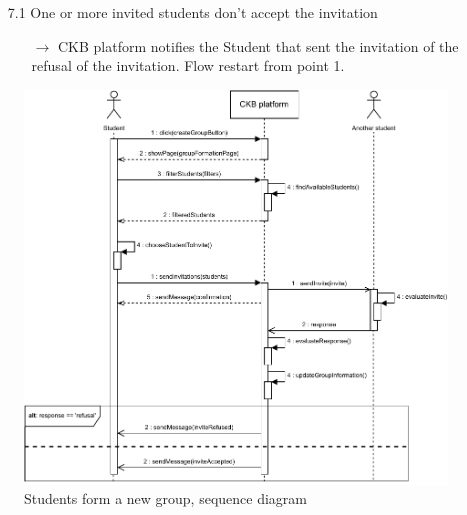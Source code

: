 \documentclass{article}
\begin{document}
{\begin{enumerate}
\begin{xltabular}{\textwidth}
\begin{itemize}
\begin{itemize}
                                                    \end{itemize} 
                                                    \item[7.1] One or more invited students don't accept the invitation
                                                    \begin{itemize}
                                                        \item[$\rightarrow$] CKB platform notifies the Student that sent the invitation
                                                        of the refusal of the invitation. Flow restart from point 1.
                                                    \end{itemize} 
                                                \end{itemize}
                    \end{xltabular}
                    
                    \begin{figure}[H]
                        \centering
                        \includegraphics[scale=0.95]{images/SequenceDiagrams/Sequence9.pdf}
                        \caption{Students form a new group, sequence diagram}
                        \label{fig:GroupFormationSeqDiagram}
                    \end{figure}


\end{enumerate}}
\end{document}
